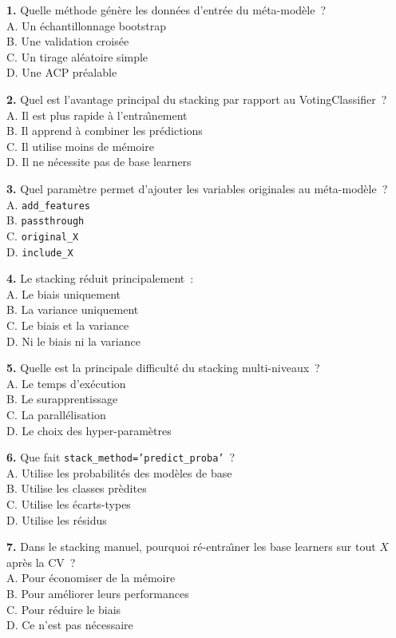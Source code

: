 \documentclass[a4paper,11pt]{article}
\theoremstyle{definition}
\theoremstyle{remark}
\begin{document}
\noindent
\textbf{1.} Quelle m\'ethode g\'en\`ere les donn\'ees d'entr\'ee du
m\'eta-mod\`ele~?\\
A. Un \'echantillonnage bootstrap\\
B. Une validation crois\'ee\\ 
C. Un tirage al\'eatoire simple\\
D. Une ACP pr\'ealable

\medskip
\noindent
\textbf{2.} Quel est l'avantage principal du stacking par rapport au
VotingClassifier~?\\
A. Il est plus rapide \`a l'entra\^\i nement\\
B. Il apprend \`a combiner les pr\'edictions\\
C. Il utilise moins de m\'emoire\\
D. Il ne n\'ecessite pas de base learners

\medskip
\noindent
\textbf{3.} Quel param\`etre permet d'ajouter les variables
originales au m\'eta-mod\`ele~?\\
A. \texttt{add\_features}\\
B. \texttt{passthrough}\\
C. \texttt{original\_X}\\
D. \texttt{include\_X}

\medskip
\noindent
\textbf{4.} Le stacking r\'eduit principalement~:\\
A. Le biais uniquement\\
B. La variance uniquement\\
C. Le biais et la variance\\
D. Ni le biais ni la variance

\medskip
\noindent
\textbf{5.} Quelle est la principale difficult\'e du stacking
multi-niveaux~?\\
A. Le temps d'ex\'ecution\\
B. Le surapprentissage\\
C. La parall\'elisation\\
D. Le choix des hyper-param\`etres

\medskip
\noindent
\textbf{6.} Que fait \texttt{stack\_method='predict\_proba'}~?\\
A. Utilise les probabilit\'es des mod\`eles de base\\
B. Utilise les classes pr\`edites\\
C. Utilise les \'ecarts-types\\
D. Utilise les r\'esidus

\medskip
\noindent
\textbf{7.} Dans le stacking manuel, pourquoi r\'e-entra\^\i ner les
base learners sur tout $X$ apr\`es la CV~?\\
A. Pour \'economiser de la m\'emoire\\
B. Pour am\'eliorer leurs performances\\
C. Pour r\'eduire le biais\\
D. Ce n'est pas n\'ecessaire
\end{document}
